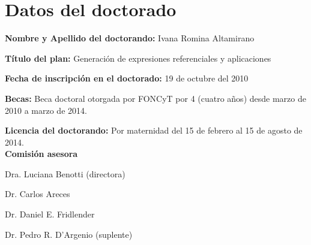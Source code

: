 \section{Datos del doctorado}
\label{datos}

{\bf Nombre y Apellido del doctorando:} Ivana Romina Altamirano

{\bf T\'itulo del plan:} Generaci\'on de expresiones referenciales y aplicaciones

{\bf Fecha de inscripci\'on en el doctorado:} 19 de octubre del 2010

{\bf Becas:} Beca doctoral otorgada por FONCyT por 4 (cuatro a\~nos) desde marzo de 2010 a marzo de 2014.  


{\bf Licencia del doctorando:} Por maternidad del 15 de febrero al 15 de agosto de 2014. \\

{\bf Comisi\'on asesora}

Dra. Luciana Benotti (directora)

Dr. Carlos Areces

Dr. Daniel E. Fridlender

Dr. Pedro R. D'Argenio (suplente)


